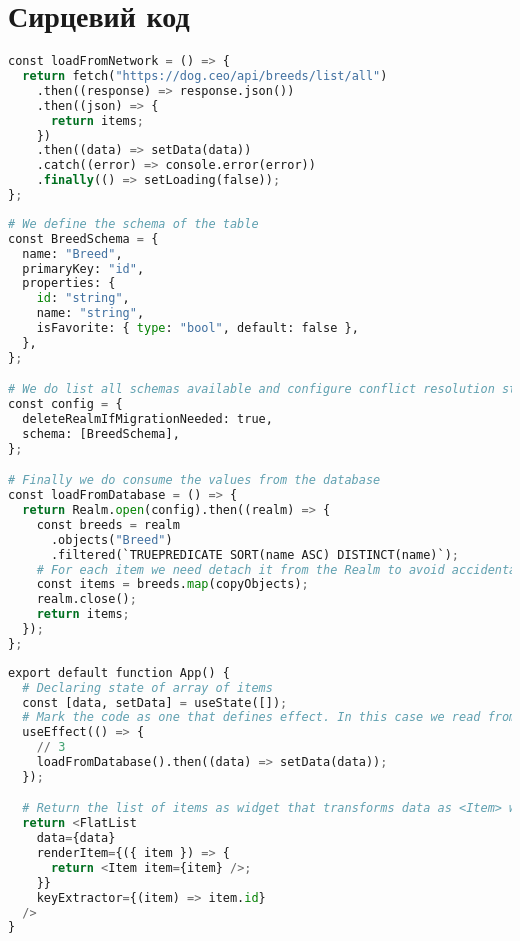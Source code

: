 \appendix
\renewcommand{\appendixname}{Додаток}


\chapter{Сирцевий код}
\label{cha:appendix1}

\begin{lstlisting}[style=light, language=Python,label={lst:rn_network},caption=React Native Network Call]
const loadFromNetwork = () => {
  return fetch("https://dog.ceo/api/breeds/list/all")
    .then((response) => response.json())
    .then((json) => {
      return items;
    })
    .then((data) => setData(data))
    .catch((error) => console.error(error))
    .finally(() => setLoading(false));
};
\end{lstlisting}

\begin{lstlisting}[style=light, language=Python,label={lst:rn_realm},caption=React Native Realm]
# We define the schema of the table
const BreedSchema = {
  name: "Breed",
  primaryKey: "id",
  properties: {
    id: "string",
    name: "string",
    isFavorite: { type: "bool", default: false },
  },
};

# We do list all schemas available and configure conflict resolution strategy
const config = {
  deleteRealmIfMigrationNeeded: true,
  schema: [BreedSchema],
};

# Finally we do consume the values from the database
const loadFromDatabase = () => {
  return Realm.open(config).then((realm) => {
    const breeds = realm
      .objects("Breed")
      .filtered(`TRUEPREDICATE SORT(name ASC) DISTINCT(name)`);
    # For each item we need detach it from the Realm to avoid accidental mutations
    const items = breeds.map(copyObjects);
    realm.close();
    return items;
  });
};
\end{lstlisting}

\begin{lstlisting}[style=light, language=Python,label={lst:rn_state_hooks},caption=React Native Hooks]
export default function App() {
  # Declaring state of array of items
  const [data, setData] = useState([]);
  # Mark the code as one that defines effect. In this case we read from DB.
  useEffect(() => {
    // 3
    loadFromDatabase().then((data) => setData(data));
  });

  # Return the list of items as widget that transforms data as <Item> widget
  return <FlatList
    data={data}
    renderItem={({ item }) => {
      return <Item item={item} />;
    }}
    keyExtractor={(item) => item.id}
  />
}
\end{lstlisting}


